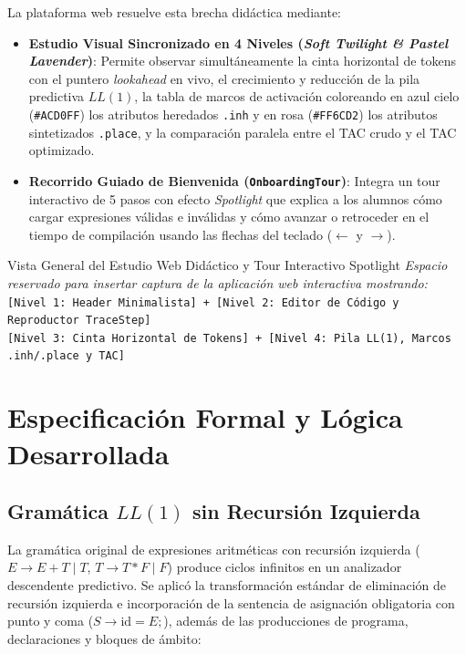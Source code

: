 \documentclass[11pt, letterpaper]{article}
\begin{document}
La plataforma web resuelve esta brecha didáctica mediante:
\begin{itemize}[leftmargin=1.6em]
    \item \textbf{Estudio Visual Sincronizado en 4 Niveles (\textit{Soft Twilight \& Pastel Lavender})}: Permite observar simultáneamente la cinta horizontal de tokens con el puntero \textit{lookahead} en vivo, el crecimiento y reducción de la pila predictiva $LL(1)$, la tabla de marcos de activación coloreando en azul cielo (\texttt{\#ACD0FF}) los atributos heredados \texttt{.inh} y en rosa (\texttt{\#FF6CD2}) los atributos sintetizados \texttt{.place}, y la comparación paralela entre el TAC crudo y el TAC optimizado.
    \item \textbf{Recorrido Guiado de Bienvenida (\texttt{OnboardingTour})}: Integra un tour interactivo de 5 pasos con efecto \textit{Spotlight} que explica a los alumnos cómo cargar expresiones válidas e inválidas y cómo avanzar o retroceder en el tiempo de compilación usando las flechas del teclado ($\leftarrow$ y $\rightarrow$).
\end{itemize}

\begin{figplaceholder}{Vista General del Estudio Web Didáctico y Tour Interactivo Spotlight}
\centering
\vspace{0.3cm}
\textit{Espacio reservado para insertar captura de la aplicación web interactiva mostrando:}\\
\texttt{[Nivel 1: Header Minimalista] + [Nivel 2: Editor de Código y Reproductor TraceStep]}\\
\texttt{[Nivel 3: Cinta Horizontal de Tokens] + [Nivel 4: Pila LL(1), Marcos .inh/.place y TAC]}
\vspace{0.2cm}
\end{figplaceholder}

\section{Especificación Formal y Lógica Desarrollada}

\subsection{Gramática $LL(1)$ sin Recursión Izquierda}
La gramática original de expresiones aritméticas con recursión izquierda ($E \rightarrow E + T \mid T$, $T \rightarrow T * F \mid F$) produce ciclos infinitos en un analizador descendente predictivo. Se aplicó la transformación estándar de eliminación de recursión izquierda e incorporación de la sentencia de asignación obligatoria con punto y coma ($S \rightarrow \text{id} = E ;$), además de las producciones de programa, declaraciones y bloques de ámbito:
\end{document}
